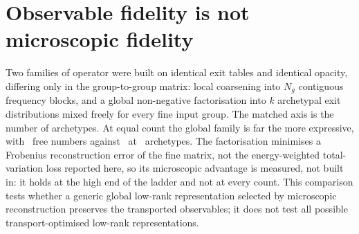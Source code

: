 \documentclass[aps,prl,twocolumn,superscriptaddress,nofootinbib,longbibliography]{revtex4-2}
\begin{document}
\section{Observable fidelity is not microscopic fidelity}
\label{sec:mechanism}
Two families of operator were built on identical exit tables and identical
opacity, differing only in the group-to-group matrix: local coarsening into
$N_g$ contiguous frequency blocks, and a global non-negative factorisation
into $k$ archetypal exit distributions mixed freely for every fine input
group. The matched axis is the number of archetypes. At equal count the
global family is far the more expressive, with \PBParamsGlobal\ free
numbers against \PBParamsLocal\ at \PBContrastK\ archetypes. The
factorisation minimises a Frobenius reconstruction error of the fine
matrix, not the energy-weighted total-variation loss reported here, so its
microscopic advantage is measured, not built in: it holds at the high end
of the ladder and not at every count. This comparison tests whether a
generic global low-rank representation selected by microscopic
reconstruction preserves the transported observables; it does not test
all possible transport-optimised low-rank representations.
\end{document}
